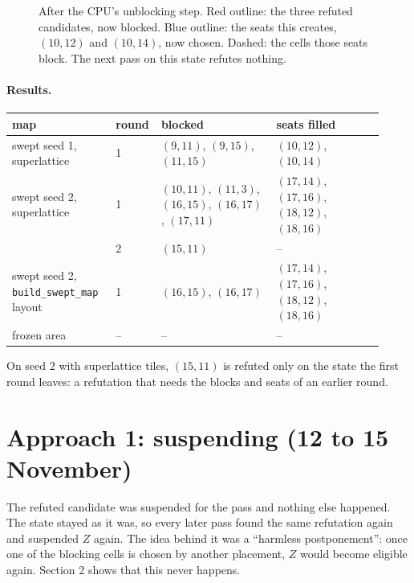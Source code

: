 \documentclass[10pt,a4paper]{article}
\newcommand{\code}[1]{\texttt{#1}}
\begin{document}
\begin{figure}[H]
\caption{After the CPU's unblocking step. Red outline: the three refuted candidates, now blocked. Blue outline: the seats this creates, $(10,12)$ and $(10,14)$, now chosen. Dashed: the cells those seats block. The next pass on this state refutes nothing.}
\end{figure}

\paragraph{Results.}
\begin{center}\small
\begin{tabular}{@{}p{0.27\linewidth}p{0.07\linewidth}p{0.3\linewidth}p{0.28\linewidth}@{}}
\toprule
map & round & blocked & seats filled\\
\midrule
swept seed 1, superlattice & 1 & $(9,11)$, $(9,15)$, $(11,15)$ & $(10,12)$, $(10,14)$\\
swept seed 2, superlattice & 1 & $(10,11)$, $(11,3)$, $(16,15)$, $(16,17)$, $(17,11)$ & $(17,14)$, $(17,16)$, $(18,12)$, $(18,16)$\\
 & 2 & $(15,11)$ & --\\
swept seed 2, \code{build\_swept\_map} layout & 1 & $(16,15)$, $(16,17)$ & $(17,14)$, $(17,16)$, $(18,12)$, $(18,16)$\\
frozen area & -- & -- & --\\
\bottomrule
\end{tabular}
\end{center}
On seed 2 with superlattice tiles, $(15,11)$ is refuted only on the state the first round leaves: a refutation that needs the blocks and seats of an earlier round.

\section{Approach 1: suspending (12 to 15 November)}

The refuted candidate was suspended for the pass and nothing else happened. The state stayed as it was, so every later pass found the same refutation again and suspended $Z$ again. The idea behind it was a ``harmless postponement'': once one of the blocking cells is chosen by another placement, $Z$ would become eligible again. Section 2 shows that this never happens.
\end{document}
